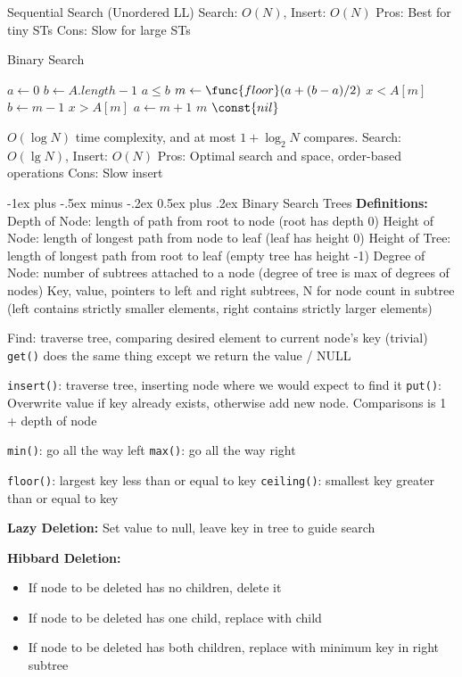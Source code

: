 \documentclass[letterpaper, 8pt]{extarticle}
\makeatletter
\renewcommand{\section}{\@startsection{section}{1}{0mm}%
                                {-1ex plus -.5ex minus -.2ex}%
                                {0.5ex plus .2ex}%
                                {\normalfont\normalsize\bfseries}}
\makeatother
\begin{document}
\begin{multicols*}{5}
  Sequential Search (Unordered LL)
  Search: $O(N)$, Insert: $O(N)$
  Pros: Best for tiny STs
  Cons: Slow for large STs

  Binary Search
  \begin{codebox}
    \li $a \gets 0$ 
    \li $b \gets A.length - 1$ 
    \li \While $a \leq b$
    \li   \Do $m \gets \func{floor}(a + (b - a) / 2)$
    \li     \If $x < A[m]$
    \li       \Do $b \gets m - 1$
    \li     \ElseIf $x > A[m]$
    \li       \Do $a \gets m + 1$
    \li     \Else \Return $m$
    \End
    \End
    \li \Return $\const{nil}$
  \end{codebox}
  $O(\log N)$ time complexity, and at most $1 + \log_2 N$ compares.
  Search: $O(\lg N)$, Insert: $O(N)$
  Pros: Optimal search and space, order-based operations
  Cons: Slow insert

  \section{Binary Search Trees}
  \textbf{Definitions:}
  Depth of Node: length of path from root to node (root has depth 0)
  Height of Node: length of longest path from node to leaf (leaf has height 0)
  Height of Tree: length of longest path from root to leaf (empty tree has height -1)
  Degree of Node: number of subtrees attached to a node (degree of tree is max of degrees of nodes)
  Key, value, pointers to left and right subtrees, N for node count in subtree (left contains strictly smaller elements, right contains strictly larger elements)

  Find: traverse tree, comparing desired element to current node's key (trivial)
  \verb|get()| does the same thing except we return the value / NULL

  \verb|insert()|: traverse tree, inserting node where we would expect to find it
  \verb|put()|: Overwrite value if key already exists, otherwise add new node. Comparisons is 1 + depth of node

  \verb|min()|: go all the way left
  \verb|max()|: go all the way right

  \verb|floor()|: largest key less than or equal to key
  \verb|ceiling()|: smallest key greater than or equal to key

  \textbf{Lazy Deletion:} Set value to null, leave key in tree to guide search

  \textbf{Hibbard Deletion:}
  \begin{itemize}
    \item If node to be deleted has no children, delete it
    \item If node to be deleted has one child, replace with child
    \item If node to be deleted has both children, replace with minimum key in right subtree
  \end{itemize}



\end{multicols*}
\end{document}
